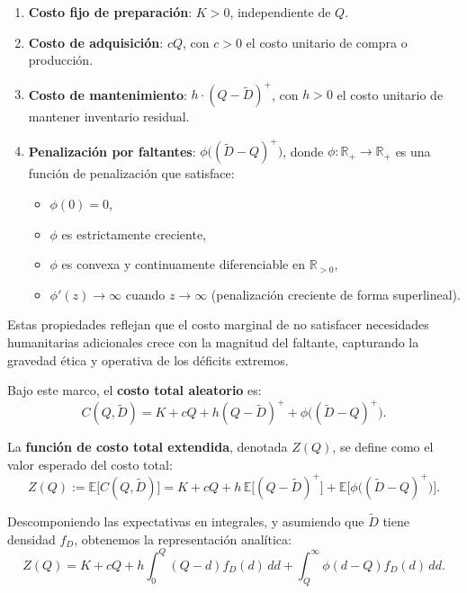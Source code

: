 \documentclass[
  spanish,
  us-letterpaper,
  DIV=11,
  numbers=noendperiod]{scrreprt}
\providecommand{\tightlist}{%
  \setlength{\itemsep}{0pt}\setlength{\parskip}{0pt}}
\numberwithin{equation}{section}
\begin{document}
\begin{enumerate}
\def\labelenumi{\arabic{enumi}.}
\tightlist
\item
  \textbf{Costo fijo de preparación}: \(K > 0\), independiente de
  \(Q\).\\
\item
  \textbf{Costo de adquisición}: \(c Q\), con \(c > 0\) el costo
  unitario de compra o producción.\\
\item
  \textbf{Costo de mantenimiento}: \(h \cdot (Q - \tilde{D})^{+}\), con
  \(h > 0\) el costo unitario de mantener inventario residual.\\
\item
  \textbf{Penalización por faltantes}:
  \(\phi\big((\tilde{D} - Q)^{+}\big)\), donde
  \(\phi: \mathbb{R}_{+} \to \mathbb{R}_{+}\) es una función de
  penalización que satisface:

  \begin{itemize}
  \tightlist
  \item
    \(\phi(0) = 0\),
  \item
    \(\phi\) es estrictamente creciente,
  \item
    \(\phi\) es convexa y continuamente diferenciable en
    \(\mathbb{R}_{>0}\),
  \item
    \(\phi'(z) \to \infty\) cuando \(z \to \infty\) (penalización
    creciente de forma superlineal).
  \end{itemize}
\end{enumerate}

Estas propiedades reflejan que el costo marginal de no satisfacer
necesidades humanitarias adicionales crece con la magnitud del faltante,
capturando la gravedad ética y operativa de los déficits extremos.

Bajo este marco, el \textbf{costo total aleatorio} es: \[
C(Q, \tilde{D}) = K + c Q + h (Q - \tilde{D})^{+} + \phi\big((\tilde{D} - Q)^{+}\big).
\]

La \textbf{función de costo total extendida}, denotada \(Z(Q)\), se
define como el valor esperado del costo total: \[
Z(Q) := \mathbb{E}\big[ C(Q, \tilde{D}) \big] = K + c Q + h \, \mathbb{E}\big[(Q - \tilde{D})^{+}\big] + \mathbb{E}\Big[\phi\big((\tilde{D} - Q)^{+}\big)\Big].
\]

Descomponiendo las expectativas en integrales, y asumiendo que
\(\tilde{D}\) tiene densidad \(f_D\), obtenemos la representación
analítica: \[
Z(Q) = K + c Q + h \int_0^Q (Q - d) f_D(d) \, dd + \int_Q^\infty \phi(d - Q) f_D(d) \, dd.
\]
\end{document}
